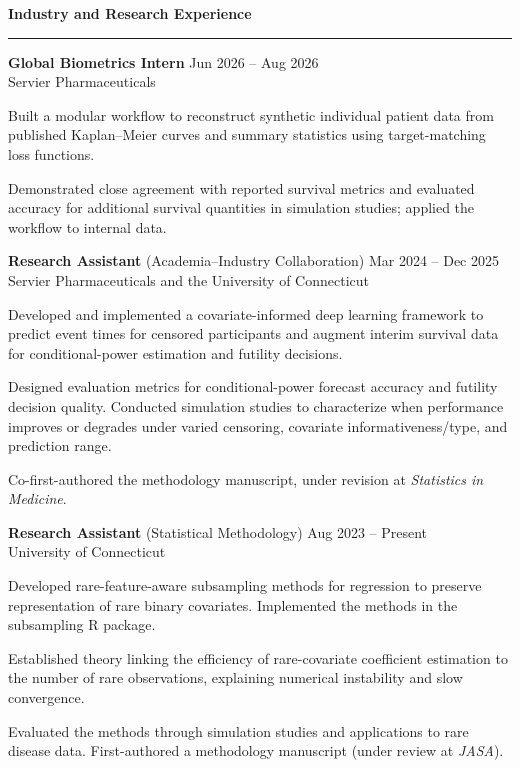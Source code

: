 \documentclass[a4paper,10pt]{article}
\newcommand{\resheading}[1]{
  \vspace{4pt}
  \noindent\textbf{\large #1}\par
  \vspace{2pt}
  \hrule
  \vspace{4pt}
}
\newenvironment{reslist}[1][0pt]{%
  \begin{list}{}{%
    \setlength{\leftmargin}{0pt}%
    \setlength{\rightmargin}{0pt}%
    \setlength{\labelwidth}{0pt}%
    \setlength{\labelsep}{0pt}%
    \setlength{\itemindent}{0pt}%
    \setlength{\listparindent}{0pt}%
    \setlength{\itemsep}{#1}%
    \setlength{\topsep}{0pt}%
    \setlength{\parsep}{0pt}%
    \setlength{\partopsep}{0pt}%
  }%
}{\end{list}}
\newenvironment{bulletlist}[1][0pt]{%
  \begin{list}{\textbullet}{%
    \setlength{\leftmargin}{14pt}%
    \setlength{\rightmargin}{0pt}%
    \setlength{\labelwidth}{8pt}%
    \setlength{\labelsep}{6pt}%
    \setlength{\itemindent}{0pt}%
    \setlength{\listparindent}{0pt}%
    \setlength{\itemsep}{#1}%
    \setlength{\topsep}{2pt}%
    \setlength{\parsep}{0pt}%
    \setlength{\partopsep}{0pt}%
  }%
}{\end{list}}
\begin{document}
\resheading{Industry and Research Experience}

\begin{reslist}[6pt]

  \item \textbf{Global Biometrics Intern} \hfill Jun 2026 -- Aug 2026 \\
  Servier Pharmaceuticals
  \begin{bulletlist}[2pt]
    \item Built a modular workflow to reconstruct synthetic individual patient data from published Kaplan--Meier curves and summary statistics using target-matching loss functions.
    \item Demonstrated close agreement with reported survival metrics and evaluated accuracy for additional survival quantities in simulation studies; applied the workflow to internal data.
  \end{bulletlist}

  \item \textbf{Research Assistant} (Academia--Industry Collaboration) \hfill Mar 2024 -- Dec 2025 \\
  Servier Pharmaceuticals and the University of Connecticut
  \begin{bulletlist}[2pt]
    \item Developed and implemented a covariate-informed deep learning framework to predict event times for censored participants and augment interim survival data for conditional-power estimation and futility decisions.
    \item Designed evaluation metrics for conditional-power forecast accuracy and futility decision quality. Conducted simulation studies to characterize when performance improves or degrades under varied censoring, covariate informativeness/type, and prediction range.
    \item Co-first-authored the methodology manuscript, under revision at \emph{Statistics in Medicine}.
  \end{bulletlist}

  \item \textbf{Research Assistant} (Statistical Methodology) \hfill Aug 2023 -- Present \\
  University of Connecticut
  \begin{bulletlist}[2pt]
    \item Developed rare-feature-aware subsampling methods for regression to preserve representation of rare binary covariates. Implemented the methods in the subsampling R package.
    \item Established theory linking the efficiency of rare-covariate coefficient estimation to the number of rare observations, explaining numerical instability and slow convergence.
    \item Evaluated the methods through simulation studies and applications to rare disease data. First-authored a methodology manuscript (under review at \emph{JASA}).
  \end{bulletlist}


\end{reslist}
\end{document}

